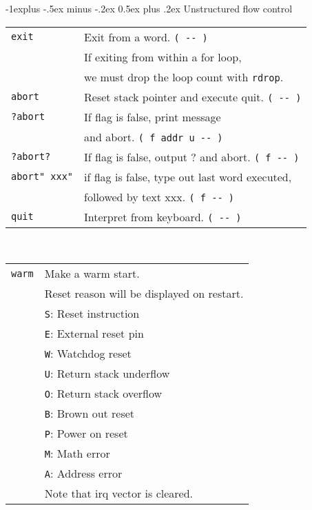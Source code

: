 \documentclass[10pt,landscape,a4paper]{article}
\makeatletter
\renewcommand{\subsection}{\@startsection{subsection}{2}{0mm}%
                                {-1explus -.5ex minus -.2ex}%
                                {0.5ex plus .2ex}%
                                {\normalfont\normalsize\bfseries}}
\newcommand{\compileonly}{\color{blue}}
\makeatother
\begin{document}
\begin{multicols}{3}
\subsection{Unstructured flow control}
\begin{tabular}{@{}ll@{}}
\verb!exit!  & Exit from a word. \verb!( -- )! \\
             & If exiting from within a for loop, \\
             & we must drop the loop count with \verb!rdrop!. \\
\verb!abort! & Reset stack pointer and execute quit. \verb!( -- )! \\
\verb!?abort!  & If flag is false, print message \\
               & and abort. \verb!( f addr u -- )! \\
\verb!?abort?!  & If flag is false, output ? and abort. \verb!( f -- )! \\
{\compileonly\verb!abort"!}\verb! xxx"!  & if flag is false, type out last word executed, \\
		    & followed by text xxx. \verb!( f -- )! \\
\verb!quit!  & Interpret from keyboard. \verb!( -- )! \\
\end{tabular}\\
\begin{tabular}{@{}ll@{}}
\verb!warm!  & Make a warm start. \\
             & Reset reason will be displayed on restart.\\
             & \verb!S!: Reset instruction\\
             & \verb!E!: External reset pin\\
             & \verb!W!: Watchdog reset\\
             & \verb!U!: Return stack underflow\\
             & \verb!O!: Return stack overflow\\
             & \verb!B!: Brown out reset\\
             & \verb!P!: Power on reset\\
             & \verb!M!: Math error\\
             & \verb!A!: Address error\\ 
             & Note that irq vector is cleared. \\
\end{tabular}

\medskip


\end{multicols}
\end{document}
